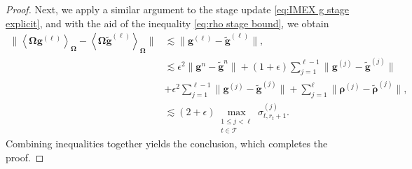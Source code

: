 \documentclass[10pt,a4paper]{amsart}
\begin{document}
\begin{proof}
    Next, we apply a similar argument to the stage update \eqref{eq:IMEX g stage explicit}, and with the aid of the inequality \eqref{eq:rho stage bound}, we obtain
    \begin{align*}
        \Big\lVert \left\langle \mathbf{\Omega} \mathbf{g}^{(\ell)} \right\rangle_{\mathbf{\Omega}} - \left\langle \mathbf{\Omega}\widetilde{\mathbf{g}}^{(\ell)} \right\rangle_{\mathbf{\Omega}} \Big\rVert &\lesssim \Big\lVert \mathbf{g}^{(\ell)} - \widetilde{\mathbf{g}}^{(\ell)} \Big\rVert, \\
        & \lesssim \epsilon^{2}  \Big\lVert \mathbf{g}^{n} - \widetilde{\mathbf{g}}^{n} \Big\rVert + (1 + \epsilon) \sum_{j=1}^{\ell-1} \Big\lVert \mathbf{g}^{(j)} - \widetilde{\mathbf{g}}^{(j)} \Big\rVert \\ &+ \epsilon^{2} \sum_{j=1}^{\ell-1}  \Big\lVert \mathbf{g}^{(j)} - \widetilde{\mathbf{g}}^{(j)} \Big\rVert + \sum_{j=1}^{\ell}\Big\lVert \boldsymbol{\rho}^{(j)} - \widetilde{\boldsymbol{\rho}}^{(j)} \Big\rVert, \\
        & \lesssim (2 + \epsilon) \max_{\substack{1 \leq j < \ell \\ t \in \mathcal{T}}} \sigma_{t,r_{t}+1}^{(j)}.
    \end{align*}
    Combining inequalities together yields the conclusion, which completes the proof.
\end{proof}
\end{document}
